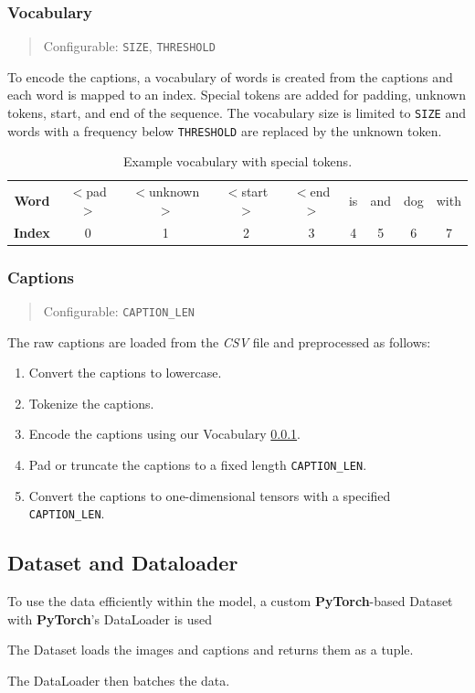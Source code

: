 \documentclass[12pt]{article}
\theoremstyle{plain}
\theoremstyle{definition}
\theoremstyle{remark}
\begin{document}
\subsubsection{Vocabulary}\label{sec:vocabulary}
\begin{quote}\center Configurable: \texttt{SIZE}, \texttt{THRESHOLD} \end{quote}
To encode the captions, a vocabulary of words is created from the captions and each word is mapped to an index. Special tokens are added for padding, unknown tokens, start, and end of the sequence. The vocabulary size is limited to \texttt{SIZE} and words with a frequency below \texttt{THRESHOLD} are replaced by the unknown token.

\begin{table}[H]
    \begin{tabular}{c|cccccccc}
        \textbf{Word} & $<$pad$>$ & $<$unknown$>$ & $<$start$>$ & $<$end$>$ & is & and & dog & with \\
        \textbf{Index} & 0 & 1 & 2 & 3 & 4 & 5 & 6 & 7
    \end{tabular}
    \caption{Example vocabulary with special tokens. \label{tab:vocabulary}}
\end{table}

\subsubsection{Captions}\label{sec:captions}
\begin{quote}\center Configurable: \texttt{CAPTION\_LEN}\end{quote}
The raw captions are loaded from the \textit{CSV} file and preprocessed as follows:
\begin{enumerate}
    \item Convert the captions to lowercase.
    \item Tokenize the captions.
    \item Encode the captions using our Vocabulary \ref{sec:vocabulary}.
    \item Pad or truncate the captions to a fixed length \texttt{CAPTION\_LEN}.
    \item Convert the captions to one-dimensional tensors with a specified \texttt{CAPTION\_LEN}.
\end{enumerate}

\subsection{Dataset and Dataloader}\label{sec:dataset}
To use the data efficiently within the model, a custom \textbf{PyTorch}-based Dataset with \textbf{PyTorch}'s DataLoader is used
\par The Dataset loads the images and captions and returns them as a tuple.
\par The DataLoader then batches the data.
\end{document}

